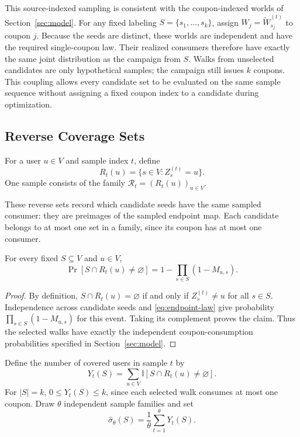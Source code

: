 \documentclass[sigconf]{acmart}
\newcommand{\I}{\mathbb{I}}
\begin{document}
This source-indexed sampling is consistent with the coupon-indexed
worlds of Section~\ref{sec:model}. For any fixed labeling
$S=\{s_1,\ldots,s_k\}$, assign
$W_j=\widetilde W_{s_j}^{(t)}$ to coupon $j$. Because the seeds are
distinct, these worlds are independent and have the required
single-coupon law. Their realized consumers therefore have exactly
the same joint distribution as the campaign from $S$. Walks from
unselected candidates are only hypothetical samples; the campaign
still issues $k$ coupons. This coupling allows every candidate set to
be evaluated on the same sample sequence without assigning a fixed
coupon index to a candidate during optimization.

\subsection{Reverse Coverage Sets}
\label{sec:reverse-coverage}

\begin{definition}
For a user $u\in V$ and sample index $t$, define
\[
  R_t(u)=\{s\in V:Z_s^{(t)}=u\}.
\]
One sample consists of the family $\mathcal{R}_t=(R_t(u))_{u\in V}$.
\end{definition}

These reverse sets record which candidate seeds have the same sampled
consumer: they are preimages of the sampled endpoint map. Each
candidate belongs to at most one set in a family, since its coupon
has at most one consumer.

\begin{lemma}
\label{lem:coverage}
For every fixed $S\subseteq V$ and $u\in V$,
\begin{equation}
\label{eq:reverse-coverage}
  \Pr[S\cap R_t(u)\ne\varnothing]
    =1-\prod_{s\in S}(1-M_{u,s}).
\end{equation}
\end{lemma}

\begin{proof}
By definition, $S\cap R_t(u)=\varnothing$ if and only if
$Z_s^{(t)}\ne u$ for all $s\in S$. Independence across candidate
seeds and \eqref{eq:endpoint-law} give probability
$\prod_{s\in S}(1-M_{u,s})$ for this event. Taking its complement
proves the claim. Thus the selected walks have exactly the independent
coupon-consumption probabilities specified in Section~\ref{sec:model}.
\end{proof}

Define the number of covered users in sample $t$ by
\[
  Y_t(S)=\sum_{u\in V}\I[S\cap R_t(u)\ne\varnothing].
\]
For $|S|=k$, $0\leq Y_t(S)\leq k$, since each selected walk consumes
at most one coupon. Draw $\theta$ independent sample families and set
\begin{equation}
\label{eq:empirical-spread}
  \hat{\sigma}_{\theta}(S)=\frac1\theta\sum_{t=1}^{\theta}Y_t(S).
\end{equation}
\end{document}
